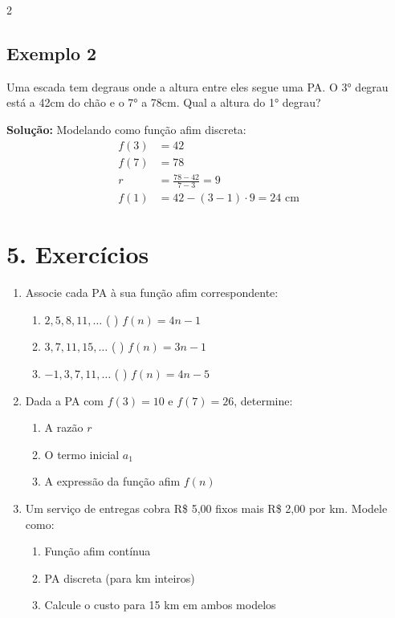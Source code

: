\documentclass[11pt]{article}
\begin{document}
\begin{multicols}{2}
\subsection*{Exemplo 2}
Uma escada tem degraus onde a altura entre eles segue uma PA. O 3° degrau está a 42cm do chão e o 7° a 78cm. Qual a altura do 1° degrau?

\textbf{Solução:}
Modelando como função afim discreta:
\begin{align*}
f(3) &= 42 \\
f(7) &= 78 \\
r &= \frac{78-42}{7-3} = 9 \\
f(1) &= 42 - (3-1)\cdot9 = 24 \text{ cm}
\end{align*}

\section*{5. Exercícios}
\begin{enumerate}
\item Associe cada PA à sua função afim correspondente:
\begin{enumerate}[label=\alph*)]
\item $2, 5, 8, 11, \ldots$ \quad ( ) $f(n) = 4n - 1$
\item $3, 7, 11, 15, \ldots$ \quad ( ) $f(n) = 3n - 1$
\item $-1, 3, 7, 11, \ldots$ \quad ( ) $f(n) = 4n - 5$
\end{enumerate}

\item Dada a PA com $f(3) = 10$ e $f(7) = 26$, determine:
\begin{enumerate}[label=\alph*)]
\item A razão $r$
\item O termo inicial $a_1$
\item A expressão da função afim $f(n)$
\end{enumerate}

\item Um serviço de entregas cobra R\$ 5,00 fixos mais R\$ 2,00 por km. Modele como:
\begin{enumerate}[label=\alph*)]
\item Função afim contínua
\item PA discreta (para km inteiros)
\item Calcule o custo para 15 km em ambos modelos
\end{enumerate}

\end{enumerate}

\end{multicols}
\end{document}

